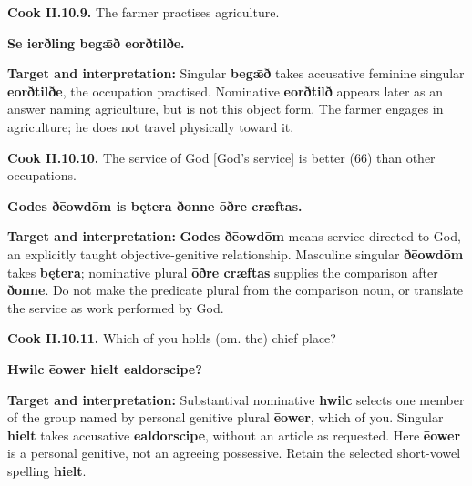 \par\begin{minipage}{\linewidth}\raggedright
\textbf{Cook II.10.9.} The farmer practises agriculture.

\textbf{Se ierðling begǣð eorðtilðe.}

\textbf{Target and interpretation:} Singular \textbf{begǣð} takes accusative feminine singular \textbf{eorðtilðe}, the occupation practised. Nominative \textbf{eorðtilð} appears later as an answer naming agriculture, but is not this object form. The farmer engages in agriculture; he does not travel physically toward it.

\end{minipage}\par\addvspace{4pt}

\par\begin{minipage}{\linewidth}\raggedright
\textbf{Cook II.10.10.} The service of God [God’s service] is better (66) than other occupations.

\textbf{Godes ðēowdōm is bętera ðonne ōðre cræftas.}

\textbf{Target and interpretation:} \textbf{Godes ðēowdōm} means service directed to God, an explicitly taught objective-genitive relationship. Masculine singular \textbf{ðēowdōm} takes \textbf{bętera}; nominative plural \textbf{ōðre cræftas} supplies the comparison after \textbf{ðonne}. Do not make the predicate plural from the comparison noun, or translate the service as work performed by God.

\end{minipage}\par\addvspace{4pt}

\par\begin{minipage}{\linewidth}\raggedright
\textbf{Cook II.10.11.} Which of you holds (om. the) chief place?

\textbf{Hwilc ēower hielt ealdorscipe?}

\textbf{Target and interpretation:} Substantival nominative \textbf{hwilc} selects one member of the group named by personal genitive plural \textbf{ēower}, which of you. Singular \textbf{hielt} takes accusative \textbf{ealdorscipe}, without an article as requested. Here \textbf{ēower} is a personal genitive, not an agreeing possessive. Retain the selected short-vowel spelling \textbf{hielt}.

\end{minipage}\par\addvspace{4pt}

